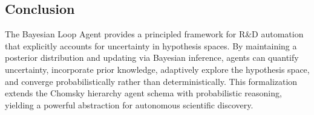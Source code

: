 \subsection{Conclusion}

The Bayesian Loop Agent provides a principled framework for R\&D automation that explicitly accounts for uncertainty in hypothesis spaces. By maintaining a posterior distribution and updating via Bayesian inference, agents can quantify uncertainty, incorporate prior knowledge, adaptively explore the hypothesis space, and converge probabilistically rather than deterministically. This formalization extends the Chomsky hierarchy agent schema with probabilistic reasoning, yielding a powerful abstraction for autonomous scientific discovery.